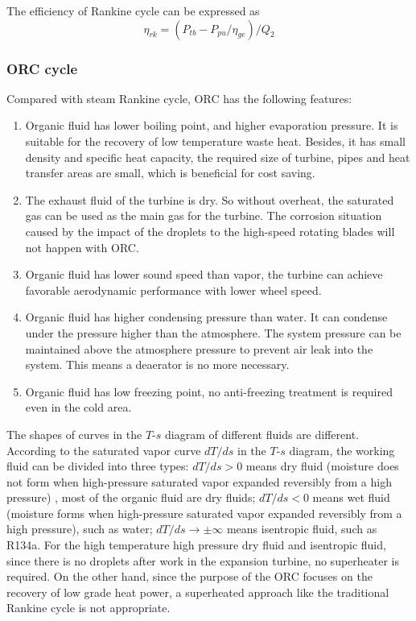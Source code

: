 The efficiency of Rankine cycle can be expressed as
\begin{equation}
	\eta_{rk}=(P_{tb}-P_{pu}/\eta_{ge})/Q_{2}
\end{equation}

  \subsubsection{ORC cycle}
  
  Compared with steam Rankine cycle, ORC has the following features:
  \begin{enumerate}[label=(\arabic*)]
  \item Organic fluid has lower boiling point, and higher evaporation pressure. It is suitable for the recovery of low temperature waste heat. Besides, it has small density and specific heat capacity, the required size of turbine, pipes and heat transfer areas are small, which is beneficial for cost saving.
  \item The exhaust fluid of the turbine is dry. So without overheat, the saturated gas can be used as the main gas for the turbine. The corrosion situation caused by the impact of the droplets to the high-speed rotating blades will not happen with ORC.
  \item Organic fluid has lower sound speed than vapor, the turbine can achieve favorable aerodynamic performance with lower wheel speed. 
  \item Organic fluid has higher condensing pressure than water. It can condense under the pressure higher than the atmosphere. The system pressure can be maintained above the atmosphere pressure to prevent air leak into the system. This means a deaerator is no more necessary.
  \item Organic fluid has low freezing point, no anti-freezing treatment is required even in the cold area.
\end{enumerate}

The shapes of curves in the $T$-$s$ diagram of different fluids are different. According to the saturated vapor curve $dT/ds$ in the $T$-$s$ diagram, the working fluid can be divided into three types: $dT / ds > 0$ means dry fluid (moisture does not form when high-pressure saturated vapor expanded reversibly from a high pressure) , most of the organic fluid are dry fluids; $dT / ds < 0$ means wet fluid (moisture forms when high-pressure saturated vapor expanded reversibly from a high pressure), such as water; $dT/ds \rightarrow \pm\infty$ means isentropic fluid, such as R134a. For the high temperature high pressure dry fluid and isentropic fluid, since there is no droplets after work in the expansion turbine, no superheater is required. On the other hand, since the purpose of the ORC focuses on the recovery of low grade heat power, a superheated approach like the traditional Rankine cycle is not appropriate. 

